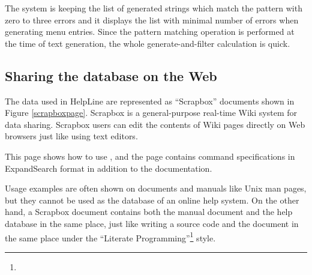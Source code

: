 \documentclass[manuscript,anonymous,review]{acmart}
\def\HL{\textsf{HelpLine}}
\def\ES{\textsf{ExpandSearch}}
\def\SB{\textsf{Scrapbox}}
\begin{document}
The system is keeping the list of generated strings
which match the pattern with zero to three errors
and it displays the list with minimal number of errors
when generating menu entries.
% 
Since the pattern matching operation is performed at the time of text generation,
the whole generate-and-filter calculation is quick.



\subsection{Sharing the database on the Web}

The data used in {\HL} are represented as ``{\SB}'' documents
shown in Figure \ref{scrapboxpage}.
%
{\SB} is a general-purpose real-time Wiki system for data sharing.
{\SB} users can edit the contents of Wiki pages directly
on Web browsers just like using text editors.


This page shows how to use , and
the page contains command specifications in {\ES} format
in addition to the documentation.


Usage examples are often shown on documents and manuals like Unix man pages,
but they cannot be used as the database of an online help system.
On the other hand,
a {\SB} document contains both the manual document and the help database
in the same place, just like
writing a source code and the document in the same place
under the ``Literate Programming''\footnote{
} style.
\end{document}
